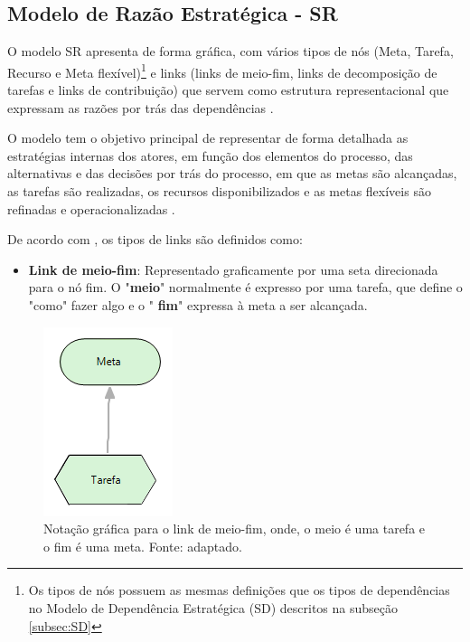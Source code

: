 \subsection{Modelo de Razão Estratégica - SR}
\label{subsec:SR}

O modelo SR apresenta de forma gráfica, com vários tipos de nós (Meta, Tarefa, Recurso e Meta flexível)\footnote[1]{Os tipos de nós possuem as mesmas definições que os tipos de dependências no Modelo de Dependência Estratégica (SD) descritos na subseção \ref{subsec:SD}} e links (links de meio-fim, links de decomposição de tarefas e links de contribuição) que servem como estrutura representacional que expressam as razões por trás das dependências \cite{istarwiki20}.

O modelo tem o objetivo principal de representar de forma detalhada as estratégias internas dos atores, em função dos elementos do processo, das alternativas e das decisões por trás do processo, em que as metas são alcançadas, as tarefas são realizadas, os recursos disponibilizados e as metas flexíveis são refinadas e operacionalizadas \cite{napolitano2009estrategia}.  

De acordo com \cite{istarwiki20}, os tipos de links são definidos como: 

\begin{itemize}
	\item \textbf{Link de meio-fim}: Representado graficamente por uma seta direcionada para o nó fim. O "\textbf{meio}" normalmente é expresso por uma tarefa, que define o "como" fazer algo e o " \textbf{fim}" expressa à meta a ser alcançada.
\end{itemize}

\begin{figure}[h!]
	\centering
	\includegraphics[keepaspectratio=true,scale=0.6]{figuras/meioFim.PNG}
	\caption{Notação gráfica para o link de meio-fim, onde, o meio é uma tarefa e o fim é uma meta. Fonte: \cite{istarwiki20} adaptado.}
	\label{meiofim}
\end{figure} 

